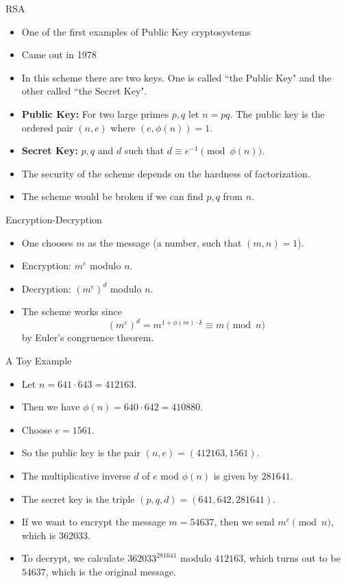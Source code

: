 \documentclass[ %
 usenames,dvipsnames,
aspectratio=169,11pt ]{beamer}
\newenvironment{stepitemize}{\begin{itemize}[<+->]}{\end{itemize} }
\begin{document}
\begin{frame}{RSA}
\begin{stepitemize}
    \item One of the first examples of Public Key cryptosystems
    \item Came out in 1978
    \item In this scheme there are two keys. One is called ``the Public Key" and the other called ``the Secret Key".
    \item {\bf Public Key:} For two large primes $p, q$ let $n=pq$. The public key is the ordered pair $(n,e)$ where $(e, \phi(n))=1$.
    \item {\bf Secret Key:} $p, q$ and $d$ such that $d\equiv e^{-1} \pmod{\phi(n)}$.
    \item The security of the scheme depends on the hardness of factorization.
    \item The scheme would be broken if we can find $p, q$ from $n$.
    \end{stepitemize}
    \end{frame}

\begin{frame}{Encryption-Decryption}
\begin{stepitemize}
    \item  One chooses $m$ as the message (a number, such that $(m,n)=1$).
    \item Encryption: $m^e$ modulo $n$.
    \item Decryption: $(m^e)^d$ modulo $n$.
    \item The scheme works since
$$(m^e)^d = m^{1+\phi(m)\cdot k} \equiv m \pmod{n}$$
by Euler's congruence theorem.

\end{stepitemize}

\end{frame}

\begin{frame}{A Toy Example}
\begin{stepitemize}
\item Let $n=641\cdot643 = 412163$.
\item Then we have $\phi(n)=640\cdot 642 = 410880$.
\item Choose $e=1561$.
\item So the public key is the pair $(n,e) = (412163,1561)$.
\item The multiplicative inverse $d$ of $e$ mod $\phi(n)$ is given by $281641$.
\item The secret key is the triple $(p,q,d) = (641, 642,281641)$.
\item If we want to encrypt the message $m=54637$, then we send $m^e \pmod{n}$, which is $362033$.
\item To decrypt, we calculate $362033^{281641}$ modulo $412163$, which turns out to be $54637$, which is the original message.
\end{stepitemize}
\end{frame}
\end{document}
